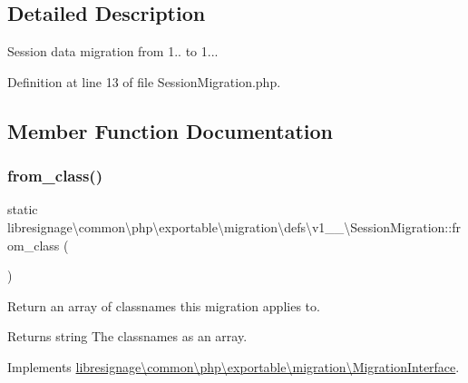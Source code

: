 \subsection{Detailed Description}
Session data migration from 1.. to 1... 

Definition at line 13 of file Session\+Migration.\+php.



\subsection{Member Function Documentation}
\mbox{\label{classlibresignage_1_1common_1_1php_1_1exportable_1_1migration_1_1defs_1_1v1__0__0_1_1SessionMigration_a1d09414946c5894b5d68aac4f719c213}} 
\subsubsection{\texorpdfstring{from\+\_\+class()}{from\_class()}}
{\footnotesize\ttfamily static libresignage\textbackslash{}common\textbackslash{}php\textbackslash{}exportable\textbackslash{}migration\textbackslash{}defs\textbackslash{}v1\+\_\+\_\textbackslash{}\+Session\+Migration\+::from\+\_\+class (\begin{DoxyParamCaption}{ }\end{DoxyParamCaption})\hspace{0.3cm}{\ttfamily [static]}}

Return an array of classnames this migration applies to.

\begin{DoxyReturn}{Returns}
string The classnames as an array. 
\end{DoxyReturn}


Implements \hyperlink{interfacelibresignage_1_1common_1_1php_1_1exportable_1_1migration_1_1MigrationInterface_aa8eb2e4ff59358ae551061687540f724}{libresignage\textbackslash{}common\textbackslash{}php\textbackslash{}exportable\textbackslash{}migration\textbackslash{}\+Migration\+Interface}.




